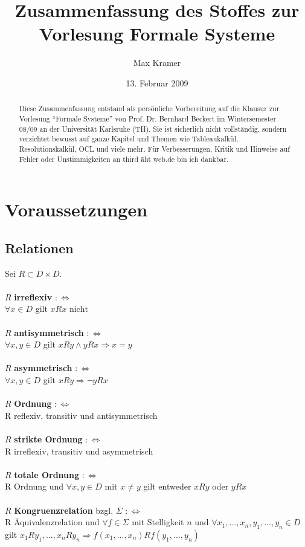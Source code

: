 \documentclass[a4paper,11pt]{scrartcl}
\title{Zusammenfassung des Stoffes zur Vorlesung Formale Systeme}
\author{Max Kramer}
\date{13. Februar 2009}
\newcommand{\tbf}{\textbf}
\newcommand{\Lra}{\Leftrightarrow}
\theoremstyle{default}
\begin{document}
\maketitle

\begin{abstract}
Diese Zusammenfassung entstand als persönliche Vorbereitung auf die Klausur zur Vorlesung ``Formale Systeme'' von Prof. Dr. Bernhard Beckert im Wintersemester 08/09 an der Universität Karlsruhe (TH). Sie ist sicherlich nicht vollständig, sondern verzichtet bewusst auf ganze Kapitel und Themen wie Tableaukalkül, Resolutionskalkül, OCL und viele mehr. Für Verbesserungen, Kritik und Hinweise auf Fehler oder Unstimmigkeiten an third äht web.de bin ich dankbar.
\end{abstract}

\setcounter{tocdepth}{1}
\tableofcontents

\newpage
\section{Voraussetzungen}
\subsection{Relationen}
Sei $R \subset D \times D$. \\
\ \\ $R$ \tbf{irreflexiv} $:\Lra$ \\
$\forall x \in D$ gilt $xRx \text{ nicht}$ \\
\ \\ $R$ \tbf{antisymmetrisch} $:\Lra$ \\
$\forall x,y \in D$ gilt $xRy \land yRx \Rightarrow x = y$ \\
\ \\ $R$ \tbf{asymmetrisch} $:\Lra$ \\
$\forall x,y \in D$ gilt $xRy \Rightarrow \neg yRx$ \\
\ \\ $R$ \tbf{Ordnung} $:\Lra$ \\
R reflexiv, transitiv und antisymmetrisch \\
\ \\ $R$ \tbf{strikte Ordnung} $:\Lra$ \\
R irreflexiv, transitiv und asymmetrisch \\
\ \\ $R$ \tbf{totale Ordnung} $:\Lra$ \\
R Ordnung und $\forall x,y \in D$ mit $x \not = y$ gilt entweder $xRy$ oder $yRx$ \\
\ \\ $R$ \tbf{Kongruenzrelation} bzgl. $\Sigma$ $:\Lra$ \\
R Äquivalenzrelation und $\forall f \in \Sigma$ mit Stelligkeit $n$ und $\forall x_1, ..., x_n, y_1, ..., y_n \in D$ gilt $x_{1}Ry_{1}, ..., x_{n}Ry_{n} \Rightarrow f(x_1, ..., x_n)Rf(y_1, ..., y_n)$ \\
\end{document}
